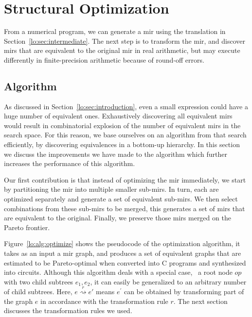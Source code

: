 \section{Structural Optimization}
\label{lo:sec:structural_optimization}

From a numerical program, we can generate a \gls{mir} using the translation
in Section~\ref{lo:sec:intermediate}.  The next step is to transform the
\gls{mir}, and discover \glspl{mir} that are equivalent to the original
\gls{mir} in real arithmetic, but may execute differently in finite-precision
arithmetic because of round-off errors.

\subsection{Algorithm}
\label{lo:sub:algorithm}


As discussed in Section~\ref{lo:sec:introduction}, even a small expression
could have a huge number of equivalent ones.  Exhaustively discovering
all equivalent \glspl{mir} would result in combinatorial explosion of the
number of equivalent \glspl{mir} in the search space.  For this reason, we
base ourselves on an algorithm from \soap{} that search efficiently, by
discovering equivalences in a bottom-up hierarchy.  In this section we discuss
the improvements we have made to the algorithm which further increases the
performance of this algorithm.

Our first contribution is that instead of optimizing the \gls{mir} immediately,
we start by partitioning the \gls{mir} into multiple smaller sub-\glspl{mir}.
In turn, each are optimized separately and generate a set of equivalent
sub-\glspl{mir}.  We then select combinations from these sub-\glspl{mir}
to be merged, this generates a set of \glspl{mir} that are equivalent to
the original.  Finally, we preserve those \glspl{mir} merged on the Pareto
frontier.

Figure~\ref{lo:alg:optimize} shows the pseudocode of the optimization
algorithm, it takes as an input a \gls{mir} graph, and produces a set of
equivalent graphs that are estimated to be Pareto-optimal when converted into
C programs and synthesized into circuits.  Although this algorithm deals with
a special case, \ie~a root node $op$ with two child subtrees $e_1, e_2$, it
can easily be generalized to an arbitrary number of child subtrees.  Here,
$e \stackrel{r}{\rightsquigarrow} e'$ means $e^\prime$ can be obtained by
transforming part of the graph $e$ in accordance with the transformation rule
$r$.  The next section discusses the transformation rules we used.

